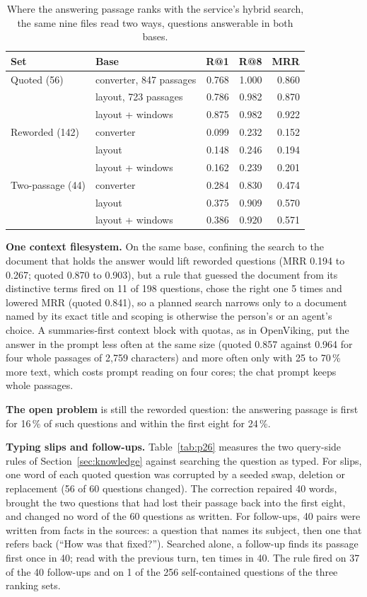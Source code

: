 \begin{table}[t]
\centering\scriptsize
\caption{Where the answering passage ranks with the service's hybrid search, the same nine files read two ways, questions answerable in both bases.}
\label{tab:p28}
\begin{tabular}{@{}llrrr@{}}
\toprule
Set & Base & R@1 & R@8 & MRR \\
\midrule
Quoted (56) & converter, 847 passages & 0.768 & 1.000 & 0.860 \\
 & layout, 723 passages & 0.786 & 0.982 & 0.870 \\
 & layout + windows & 0.875 & 0.982 & 0.922 \\
Reworded (142) & converter & 0.099 & 0.232 & 0.152 \\
 & layout & 0.148 & 0.246 & 0.194 \\
 & layout + windows & 0.162 & 0.239 & 0.201 \\
Two-passage (44) & converter & 0.284 & 0.830 & 0.474 \\
 & layout & 0.375 & 0.909 & 0.570 \\
 & layout + windows & 0.386 & 0.920 & 0.571 \\
\bottomrule
\end{tabular}
\end{table}

\textbf{One context filesystem.} On the same base, confining the search to
the document that holds the answer would lift reworded questions (MRR 0.194
to 0.267; quoted 0.870 to 0.903), but a rule that guessed the document from
its distinctive terms fired on 11 of 198 questions, chose the right one 5
times and lowered MRR (quoted 0.841), so a planned search narrows only to a
document named by its exact title and scoping is otherwise the person's or
an agent's choice. A summaries-first context block with quotas, as in
OpenViking, put the answer in the prompt less often at the same size
(quoted 0.857 against 0.964 for four whole passages of 2{,}759 characters)
and more often only with 25 to 70\,\% more text, which costs prompt reading
on four cores; the chat prompt keeps whole passages.

\textbf{The open problem} is still the reworded question: the answering
passage is first for 16\,\% of such questions and within the first eight for
24\,\%.

\textbf{Typing slips and follow-ups.} Table~\ref{tab:p26} measures the two
query-side rules of Section~\ref{sec:knowledge} against searching the question
as typed. For slips, one word of each quoted question was corrupted by a
seeded swap, deletion or replacement (56 of 60 questions changed). The
correction repaired 40 words, brought the two questions that had lost their
passage back into the first eight, and changed no word of the 60 questions as
written. For follow-ups, 40 pairs were written from facts in the sources: a
question that names its subject, then one that refers back (``How was that
fixed?''). Searched alone, a follow-up finds its passage first once in 40;
read with the previous turn, ten times in 40. The rule fired on 37 of the 40
follow-ups and on 1 of the 256 self-contained questions of the three ranking
sets.

